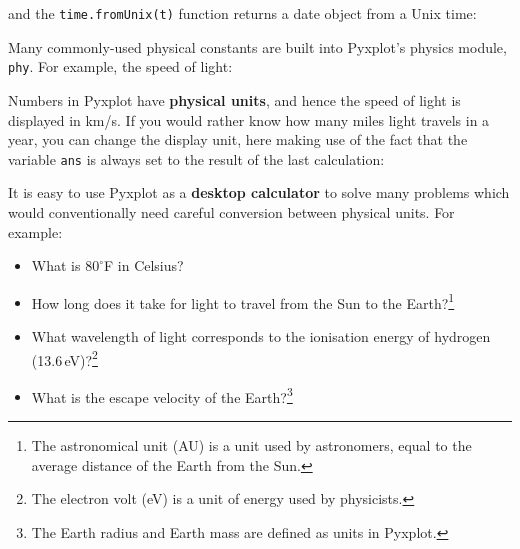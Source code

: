 \noindent and the {\tt time.fromUnix(t)} function returns a date object from a
Unix time:

\vspace{3mm}

\vspace{3mm}

Many commonly-used physical constants are built into Pyxplot's physics module,
{\tt phy}. For example, the speed of light:

\vspace{3mm}

\vspace{3mm}

\noindent Numbers in Pyxplot have {\bf physical units}, and hence the speed of
light is displayed in km/s. If you would rather know how many miles light
travels in a year, you can change the display unit, here making use of the fact
that the variable {\tt ans} is always set to the result of the last
calculation:

\vspace{3mm}

\vspace{3mm}

\noindent It is easy to use Pyxplot as a {\bf desktop calculator} to solve many
problems which would conventionally need careful conversion between physical
units. For example:

\begin{itemize}
\item What is $80^\circ$F in Celsius?

\vspace{3mm}

\vspace{3mm}

\item How long does it take for light to travel from the Sun to the
Earth?\footnote{The astronomical unit (AU) is a unit used by astronomers, equal
to the average distance of the Earth from the Sun.}

\vspace{3mm}

\vspace{3mm}

\item What wavelength of light corresponds to the ionisation energy of hydrogen
(13.6\,eV)?\footnote{The electron volt (eV) is a unit of energy used by
physicists.}

\vspace{3mm}

\vspace{3mm}

\item What is the escape velocity of the Earth?\footnote{The Earth radius and
Earth mass are defined as units in Pyxplot.}

\vspace{3mm}

\vspace{3mm}
\end{itemize}

